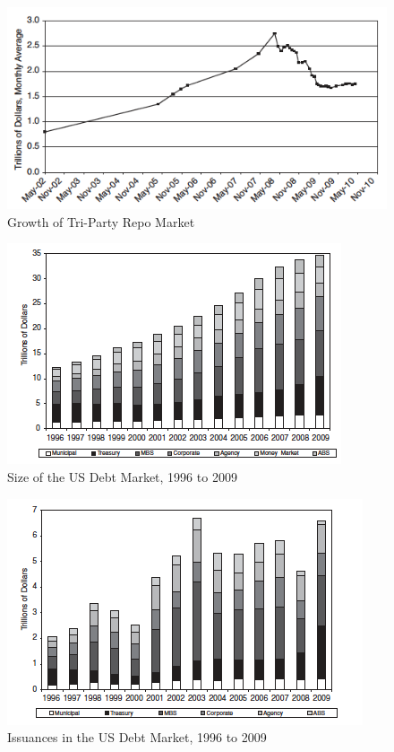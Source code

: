\documentclass[11pt]{beamer}
\begin{document}
\begin{frame}
\begin{figure}
\includegraphics[width=\textwidth]{11_5.png}
\caption{Growth of Tri-Party Repo Market}
\end{figure}
\end{frame}

\begin{frame}
\begin{figure}
\includegraphics[width=\textwidth]{11_7.png}
\caption{Size of the US Debt Market, 1996 to 2009}
\end{figure}
\end{frame}

\begin{frame}
\begin{figure}
\includegraphics[width=\textwidth]{11_8.png}
\caption{Issuances in the US Debt Market, 1996 to 2009}
\end{figure}
\end{frame}
\end{document}

